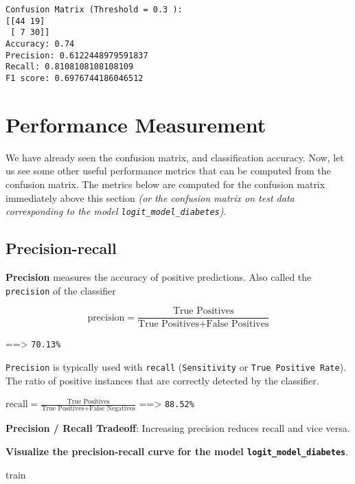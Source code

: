 \documentclass[
  letterpaper,
  DIV=11,
  numbers=noendperiod]{scrreprt}
\newenvironment{Shaded}{\begin{snugshade}}{\end{snugshade}}
\newcommand{\NormalTok}[1]{\textcolor[rgb]{0.00,0.23,0.31}{#1}}
\begin{document}
\begin{verbatim}
Confusion Matrix (Threshold = 0.3 ):
[[44 19]
 [ 7 30]]
Accuracy: 0.74
Precision: 0.6122448979591837
Recall: 0.8108108108108109
F1 score: 0.6976744186046512
\end{verbatim}

\section{Performance Measurement}\label{performance-measurement}

We have already seen the confusion matrix, and classification accuracy.
Now, let us see some other useful performance metrics that can be
computed from the confusion matrix. The metrics below are computed for
the confusion matrix immediately above this section \emph{(or the
confusion matrix on test data corresponding to the model
\texttt{logit\_model\_diabetes})}.

\subsection{Precision-recall}\label{precision-recall}

\textbf{Precision} measures the accuracy of positive predictions. Also
called the \texttt{precision} of the classifier

\[\textrm{precision} = \frac{\textrm{True Positives}}{\textrm{True Positives} + \textrm{False Positives}}\]

==\textgreater{} \texttt{70.13\%}

\texttt{Precision} is typically used with \texttt{recall}
(\texttt{Sensitivity} or \texttt{True\ Positive\ Rate}). The ratio of
positive instances that are correctly detected by the classifier.

\(\textrm{recall} = \frac{\textrm{True Positives}}{\textrm{True Positives} + \textrm{False Negatives}}\)
==\textgreater{} \texttt{88.52\%}

\textbf{Precision / Recall Tradeoff}: Increasing precision reduces
recall and vice versa.

\textbf{Visualize the precision-recall curve for the model
\texttt{logit\_model\_diabetes}}.

\begin{Shaded}
\begin{Highlighting}[]
\NormalTok{train}
\end{Highlighting}
\end{Shaded}
\end{document}
